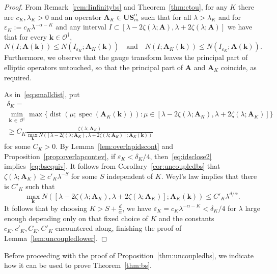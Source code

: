 \documentclass[AHL,Unicode,longabstracts,published]{cedram}
\DeclareMathOperator{\spec}{spec}
\DeclareMathOperator{\dist}{dist}
\newcommand{\CO}{\mathcal{O}}
\newcommand{\BA}{\mathbf A}
\newcommand{\BS}{\mathbf S}
\newcommand{\BU}{\mathbf U}
\newcommand{\bk}{\mathbf k}
\newcommand{\eps}{\varepsilon}
\begin{document}
\begin{proof}
From Remark~\ref{rem:Iinfinitybs} and Theorem~\ref{thm:ctou}, for any $K$ there are $c_K, \lambda_K > 0$ and an operator $\BA_K \in
\BU\BS_m^\alpha$ such that for all $\lambda > \lambda_K$ and for $\eps_K := c_K \lambda^{-\alpha - K}$ and any interval $I \subset [\lambda - 2 \zeta(\lambda;\BA),\lambda + 2
\zeta(\lambda;\BA)]$ we have that for every $\bk \in \CO^\dagger$,
\begin{equation}\label{eq:idsclose2}
N(I;\BA(\bk)) \le N(I_{\eps_K};\BA_K(\bk)) \quad \text{and} \quad N(I;\BA_K(\bk)) \le N(I_{\eps_K};\BA(\bk)).
\end{equation}
Furthermore, we observe that the gauge transform leaves the principal part of elliptic operators untouched, so that the principal part of $\BA$ and $\BA_K$ coincide, as required.


As in~\eqref{eq:smalldist}, put
\begin{multline}
\delta_K =\\
\min_{\bk\,\in\,\CO^\dagger} \max\big\{\dist(\mu;\spec(\BA_K(\bk))) : \mu \in [\lambda - 2\zeta(\lambda;\BA_K),\lambda + 2\zeta(\lambda;\BA_K)]\big\} \\
 \ge C_K \frac{\zeta(\lambda;\BA_K)}{\max_\bk N([\lambda - 2\zeta(\lambda;\BA_K),\lambda + 2 \zeta(\lambda;\BA_K)];\BA_K(\bk))}
\end{multline}
for some $C_K > 0$. By Lemma~\ref{lem:overlapidscont} and Proposition~\ref{prop:overlapcontev}, if $\eps_K < \delta_K/4$, then~\eqref{eq:idsclose2} implies~\eqref{eq:bsequiv}. It follows from Corollary~\ref{cor:uncoupledbs} that $\zeta(\lambda;\BA_K) \ge c'_K\lambda^{-S}$ for some $S$ independent of $K$. Weyl's law implies that there is $C'_K$ such that
\begin{equation}
\max_\bk N([\lambda - 2
\zeta(\lambda;\BA_K),\lambda + 2\zeta(\lambda;\BA_K)];\BA_K(\bk)) \le C'_K \lambda^{d/\alpha}.
\end{equation}
It follows that by choosing $K > S + \frac d \alpha$, we have $\eps_K = c_K
\lambda^{-\alpha - K} < \delta_K/4$ for $\lambda$ large enough depending only on that fixed choice of $K$ and the constants $c_K,c'_K,C_K,C'_K$ encountered along, finishing the proof of Lemma~\ref{lem:uncoupledlower}.
\end{proof}


Before proceeding with the proof of Proposition~\ref{thm:uncoupledbs}, we indicate how it can be used to prove Theorem~\ref{thm:bs}.
\end{document}
